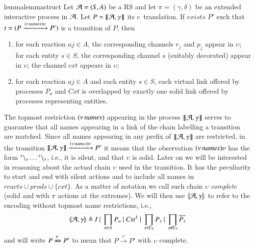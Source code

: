  \begin{restatable}[]{lemma}{lemmastruct}
 \label{lem:struct}
  Let ${\cal A} = (S, A)$ be a RS and let $\pi=(\gamma,\delta)$ be an extended  interactive process in ${\cal A}$. Let $P=\llbracket{\cal A},\gamma\rrbracket$ its c\CNA~translation. If $exists$ $P'$ such that $t= (P \xrightarrow{(\nu\, \mathit{names})\upsilon} P')$ is a transition of $P$, then
  \begin{enumerate}
  \item for each reaction  $aj \in A$, the corresponding channels $r_j$ and $p_j$ appear in  $\upsilon$; for each entity $s \in S$, the corresponding channel $s$ (suitably decorated) appear in $\upsilon$; 
  the channel $\mathit{cxt}$ appears in $\upsilon$;
  \item for each reaction $aj \in A$ and each entity $s \in S$, each virtual link offered by processes $P_a$ and $\mathit{Cxt}$ is  overlapped by exactly one solid link offered by  processes representing entities.
  \end{enumerate}
  \end{restatable}

The topmost restriction $(\nu\, \mathit{names})$ appearing in the process $\llbracket{\cal A},\gamma\rrbracket$ serves to guarantee that all names appearing in a link of the chain labelling a transition are matched.
Since all names appearing in any prefix of $\llbracket{\cal A},\gamma\rrbracket$ are restricted, in the transition $\llbracket{\cal A},\gamma\rrbracket \xrightarrow{(\nu\, \mathit{names})\upsilon} P'$ it means that the observation $(\nu\, \mathit{names})\upsilon$ has the form ${}^{\tau} \backslash_{\tau}\dots{}^{\tau} \backslash_{\tau}$, i.e., it is silent, and that $\upsilon$ is solid. Later on we will be interested in reasoning about the actual chain $\upsilon$ used in the transition.  It has the peculiarity to start and end with silent actions and to include all names in $\mathit{reacts}\cup\mathit{prods}\cup\{\mathit{cxt}\}$. As a matter of notation we call such chain $\upsilon$ \emph{complete} (solid and with $\tau$ actions at the extremes). We will then use $\llparenthesis{\cal A},\gamma\rrparenthesis$ to refer to the encoding without topmost name restrictions, i.e.,
$$
\llparenthesis{\cal A},\gamma\rrparenthesis \triangleq 
I~|~ \prod_{a\in A} P_a ~|~  \mathit{Cxt}^1~|~\prod_{s\in C_0}P_{s} ~|~ \prod_{s \notin C_0}\overline{P_s} 
$$
and will write $P\xRightarrow{\upsilon} P'$ to mean that $P\xrightarrow{\upsilon} P'$ with $\upsilon$ complete.

